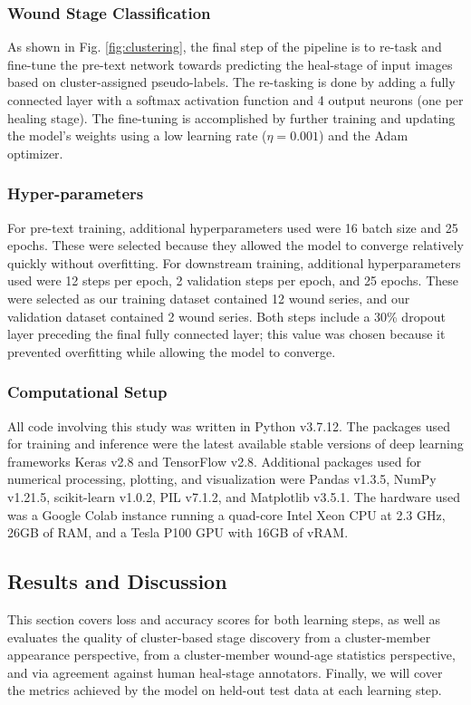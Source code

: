 \documentclass[11pt]{ucthesis}
\begin{document}
\subsubsection{Wound Stage Classification}
As shown in Fig. \ref{fig:clustering}, the final step of the pipeline is to re-task and fine-tune the pre-text network towards predicting the heal-stage of input images based on cluster-assigned pseudo-labels. The re-tasking is done by adding a fully connected layer with a softmax activation function and 4 output neurons (one per healing stage). The fine-tuning is accomplished by further training and updating the model's weights using a low learning rate ($\eta = 0.001$) and the Adam \cite{kingma2014adam} optimizer.

\subsubsection{Hyper-parameters}
For pre-text training, additional hyperparameters used were 16 batch size and 25 epochs. These were selected because they allowed the model to converge relatively quickly without overfitting. For downstream training, additional hyperparameters used were 12 steps per epoch, 2 validation steps per epoch, and 25 epochs. These were selected as our training dataset contained 12 wound series, and our validation dataset contained 2 wound series. Both steps include a 30\% dropout layer preceding the final fully connected layer; this value was chosen because it prevented overfitting while allowing the model to converge.

\subsubsection{Computational Setup}
All code involving this study was written in Python v3.7.12. The packages used for training and inference were the latest available stable versions of deep learning frameworks Keras v2.8 and TensorFlow v2.8. Additional packages used for numerical processing, plotting, and visualization were Pandas v1.3.5, NumPy v1.21.5, scikit-learn v1.0.2, PIL v7.1.2, and Matplotlib v3.5.1. The hardware used was a Google Colab instance running a quad-core Intel Xeon CPU at 2.3 GHz, 26GB of RAM, and a Tesla P100 GPU with 16GB of vRAM.

\subsection{Results and Discussion}
\label{sec:healnet_results}
This section covers loss and accuracy scores for both learning steps, as well as evaluates the quality of cluster-based stage discovery from a cluster-member appearance perspective, from a cluster-member wound-age statistics perspective, and via agreement against human heal-stage annotators. Finally, we will cover the metrics achieved by the model on held-out test data at each learning step.
\end{document}

